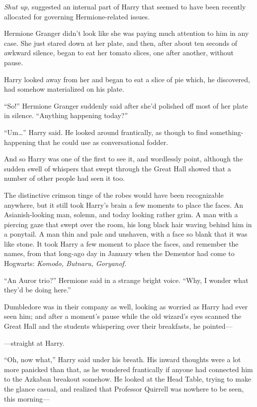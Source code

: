 \emph{Shut up,} suggested an internal part of Harry that seemed to have been
recently allocated for governing Hermione-related issues.

Hermione Granger didn’t look like she was paying much attention to him in any
case. She just stared down at her plate, and then, after about ten seconds of
awkward silence, began to eat her tomato slices, one after another, without
pause.

Harry looked away from her and began to eat a slice of pie which, he
discovered, had somehow materialized on his plate.

“So!” Hermione Granger suddenly said after she’d polished off most of her plate
in silence. “Anything happening today?”

“Um…” Harry said. He looked around frantically, as though to find
something-happening that he could use as conversational fodder.

And so Harry was one of the first to see it, and wordlessly point, although the
sudden swell of whispers that swept through the Great Hall showed that a number
of other people had seen it too.

The distinctive crimson tinge of the robes would have been recognizable
anywhere, but it still took Harry’s brain a few moments to place the faces. An
Asianish-looking man, solemn, and today looking rather grim. A man with a
piercing gaze that swept over the room, his long black hair waving behind him
in a ponytail. A man thin and pale and unshaven, with a face so blank that it
was like stone. It took Harry a few moment to place the faces, and remember the
names, from that long-ago day in January when the Dementor had come to
Hogwarts: \emph{Komodo, Butnaru, Goryanof.}

“An Auror trio?” Hermione said in a strange bright voice. “Why, I wonder what
they’d be doing here.”

Dumbledore was in their company as well, looking as worried as Harry had ever
seen him; and after a moment’s pause while the old wizard’s eyes scanned the
Great Hall and the students whispering over their breakfasts, he pointed—

—straight at Harry.

“Oh, now what,” Harry said under his breath. His inward thoughts were a lot
more panicked than that, as he wondered frantically if anyone had connected him
to the Azkaban breakout somehow. He looked at the Head Table, trying to make
the glance casual, and realized that Professor Quirrell was nowhere to be seen,
this morning—

